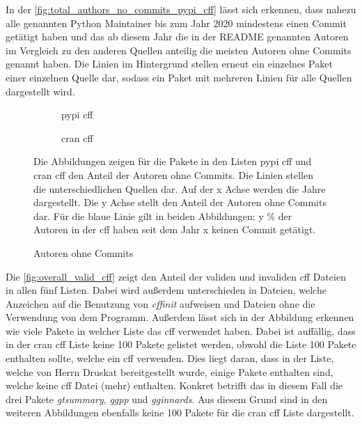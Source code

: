 In der \autoref{fig:total_authors_no_commits_pypi_cff} lässt sich erkennen, dass nahezu alle genannten Python Maintainer bis zum Jahr 2020 mindestens einen Commit getätigt haben und das ab diesem Jahr die in der README genannten Autoren im Vergleich zu den anderen Quellen anteilig die meisten Autoren ohne Commits genannt haben.
Die Linien im Hintergrund stellen erneut ein einzelnes Paket einer einzelnen Quelle dar, sodass ein Paket mit mehreren Linien für alle Quellen dargestellt wird.

\begin{figure}
    \begin{subfigure}{.5\textwidth}
        \centering
        
        \caption{\gls{pypi} \gls{cff}}
        \label{fig:total_authors_no_commits_pypi_cff}
    \end{subfigure}%
    \begin{subfigure}{.5\textwidth}
        \centering
        
        \caption{\gls{cran} \gls{cff}}
        \label{fig:total_authors_no_commits_cran_cff}
    \end{subfigure}
    \caption{Autoren ohne Commits}
    \label{fig:total_authors_no_commits}
    \small
    \raggedright
    Die Abbildungen zeigen für die Pakete in den Listen \gls{pypi} \gls{cff} und \gls{cran} \gls{cff} den Anteil der Autoren ohne Commits. Die Linien stellen die unterschiedlichen Quellen dar. Auf der x Achse werden die Jahre dargestellt. Die y Achse stellt den Anteil der Autoren ohne Commits dar. Für die blaue Linie gilt in beiden Abbildungen: y \% der Autoren in der \gls{cff} haben seit dem Jahr x keinen Commit getätigt.
\end{figure}

Die \autoref{fig:overall_valid_cff} zeigt den Anteil der validen und invaliden \gls{cff} Dateien in allen fünf Listen.
Dabei wird außerdem unterschieden in Dateien, welche Anzeichen auf die Benutzung von \emph{cffinit} aufweisen und Dateien ohne die Verwendung von dem Programm.
Außerdem lässt sich in der Abbildung erkennen wie viele Pakete in welcher Liste das \gls{cff} verwendet haben.
Dabei ist auffällig, dass in der \gls{cran} \gls{cff} Liste keine 100 Pakete gelistet werden, obwohl die Liste 100 Pakete enthalten sollte, welche ein \gls{cff} verwenden.
Dies liegt daran, dass in der Liste, welche von Herrn Druskat bereitgestellt wurde, einige Pakete enthalten sind, welche keine \gls{cff} Datei (mehr) enthalten.
Konkret betrifft das in diesem Fall die drei Pakete \emph{gtsummary}, \emph{ggpp} und \emph{gginnards}.
Aus diesem Grund sind in den weiteren Abbildungen ebenfalls keine 100 Pakete für die \gls{cran} \gls{cff} Liste dargestellt.

